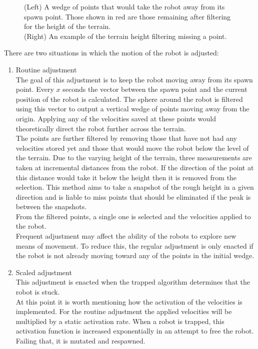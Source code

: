 \documentclass{article}
\begin{document}
\begin{figure}[H]
\begin{minipage}[t]{0.65\textwidth}
\caption{(Left) A wedge of points that would take the robot away from its spawn point. Those shown in red are those remaining after filtering for the height of the terrain.\\
(Right) An example of the terrain height filtering missing a point.} 
\end{minipage}
\end{figure}

There are two situations in which the motion of the robot is adjusted:
\begin{enumerate}
\item Routine adjustment\\
The goal of this adjustment is to keep the robot moving away from its spawn point. Every $x$ seconds the vector between the spawn point and the current position of the robot is calculated. The sphere around the robot is filtered using this vector to output a vertical wedge of points moving away from the origin. Applying any of the velocities saved at these points would theoretically direct the robot further across the terrain. \\
The points are further filtered by removing those that have not had any velocities stored yet and those that would move the robot below the level of the terrain. Due to the varying height of the terrain, three measurements are taken at incremental distances from the robot. If the direction of the point at this distance would take it below the height then it is removed from the selection. This method aims to take a snapshot of the rough height in a given direction and is liable to miss points that should be eliminated if the peak is between the snapshots. \\
From the filtered points, a single one is selected and the velocities applied to the robot. \\
Frequent adjustment may affect the ability of the robots to explore new means of movement. To reduce this, the regular adjustment is only enacted if the robot is not already moving toward any of the points in the initial wedge. 
\item Scaled adjustment\\
This adjustment is enacted when the trapped algorithm determines that the robot is stuck.\\
At this point it is worth mentioning how the activation of the velocities is implemented. For the routine adjustment the applied velocities will be multiplied by a static activation rate. When a robot is trapped, this activation function is increased exponentially in an attempt to free the robot. Failing that, it is mutated and respawned. 

\end{enumerate}
\end{document}
